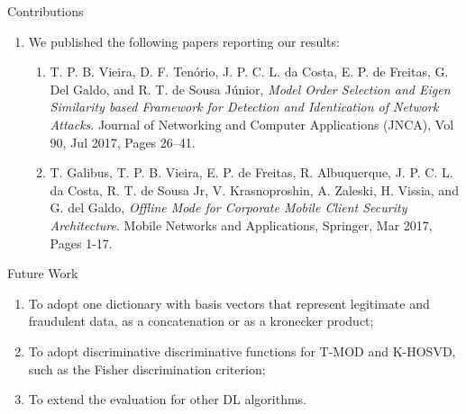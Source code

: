 \documentclass[newPxFont, numfooter, sectionpages]{beamer}
\begin{document}
\begin{frame}[c]{Contributions}
	\begin{enumerate}
		\item We published the following papers reporting our results:
		\begin{enumerate}
			\item T. P. B. Vieira, D. F. Ten\'orio, J. P. C. L. da Costa, E. P. de Freitas, G. Del Galdo, and R. T. de Sousa J\'unior, \textit{Model Order Selection and Eigen Similarity based Framework for Detection and Identication of Network Attacks}. Journal of Networking and Computer Applications (JNCA), Vol 90, Jul 2017, Pages 26–41.
			\item T. Galibus, T. P. B. Vieira, E. P. de Freitas, R. Albuquerque, J. P. C. L. da Costa, R. T. de Sousa Jr, V. Krasnoproshin, A. Zaleski, H. Vissia, and G. del Galdo, \textit{Offline Mode for Corporate Mobile Client Security Architecture}. Mobile Networks and Applications, Springer, Mar 2017, Pages 1-17.
		\end{enumerate}
	\end{enumerate}
\end{frame}
\begin{frame}[c]{Future Work}
	\begin{enumerate}
		\item To adopt one dictionary with basis vectors that represent legitimate and fraudulent data, as a concatenation or as a kronecker product;
		\item To adopt discriminative discriminative functions for T-MOD and K-HOSVD, such as the Fisher discrimination criterion;
		\item To extend the evaluation for other DL algorithms.
	\end{enumerate}
\end{frame}
\end{document}
